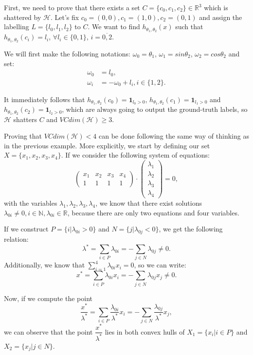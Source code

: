 \documentclass{article}
\begin{document}
First, we need to prove that there exists a set $C=\{c_0,c_1,c_2\}\in\mathbb{R}^3$ which is shattered by $\mathcal{H}$. Let's fix $c_0=(0,0),c_1=(1,0),c_2=(0,1)$ and assign the labelling $L=\{l_0,l_1,l_2\}$ to $C$. We want to find $h_{\theta_1,\theta_2}(x)$ such that $h_{\theta_1,\theta_2}(c_i)=l_i$, $\forall l_i\in\{0,1\}$, $i=\overline{0,2}$.

We will first make the following notations: $\omega_0 = \theta_1$, $\omega_1 = sin\theta_2$, $\omega_2 = cos\theta_2$ and set:
\begin{align*}
\omega_0 &= l_0, \\
\omega_i &= -\omega_0 + l_i, i\in\{1,2\}.
\end{align*}

It immediately follows that $h_{\theta_1,\theta_2}(c_0)=\mathbf{1}_{l_0>0}$, $h_{\theta_1,\theta_2}(c_1)=\mathbf{1}_{l_1>0}$ and $h_{\theta_1,\theta_2}(c_2)=\mathbf{1}_{l_2>0}$, which are always going to output the ground-truth labels, so $\mathcal{H}$ shatters $C$ and $VCdim(\mathcal{H})\geq 3$.

Proving that $VCdim(\mathcal{H}) < 4$ can be done following the same way of thinking as in the previous example. More explicitly, we start by defining our set $X=\{x_1,x_2,x_3,x_4\}$. If we consider the following system of equations:
$$
\begin{pmatrix}
x_1 & x_2 & x_3 & x_4\\
1 & 1 & 1 & 1
\end{pmatrix}
\cdot
\begin{pmatrix}
\lambda_1 \\
\lambda_2 \\
\lambda_3 \\
\lambda_4
\end{pmatrix} = 0,
$$
with the variables $\lambda_1,\lambda_2,\lambda_3,\lambda_4$, we know that there exist solutions $\lambda_{0i}\neq 0, i\in\mathbb{N}, \lambda_{0i}\in\mathbb{R}$, because there are only two equations and four variables. 

If we construct $P=\{i|\lambda_{0i}>0\}$ and $N=\{j|\lambda_{0j}<0\}$, we get the following relation:
$$
\lambda^*=\sum_{i\in P}{\lambda_{0i}}=-\sum_{j\in N}{\lambda_{0j}}\neq 0.
$$
Additionally, we know that $\displaystyle\sum_{i=1}^{4}{\lambda_{0i}x_i}=0$, so we can write:
$$
x^*=\sum_{i\in P}{\lambda_{0i}x_i}=-\sum_{j\in N}{\lambda_{0j}x_j}\neq 0.
$$

Now, if we compute the point
$$
\dfrac{x^*}{\lambda^*}=\sum_{i\in P}{\dfrac{\lambda_{0i}}{\lambda^*}x_i}=-\sum_{j\in N}{\dfrac{\lambda_{0j}}{\lambda^*}x_j},
$$
we can observe that the point $\dfrac{x^*}{\lambda^*}$ lies in both convex hulls of $X_1=\{x_i|i\in P\}$ and $X_2=\{x_j|j\in N\}$. 
\end{document}
